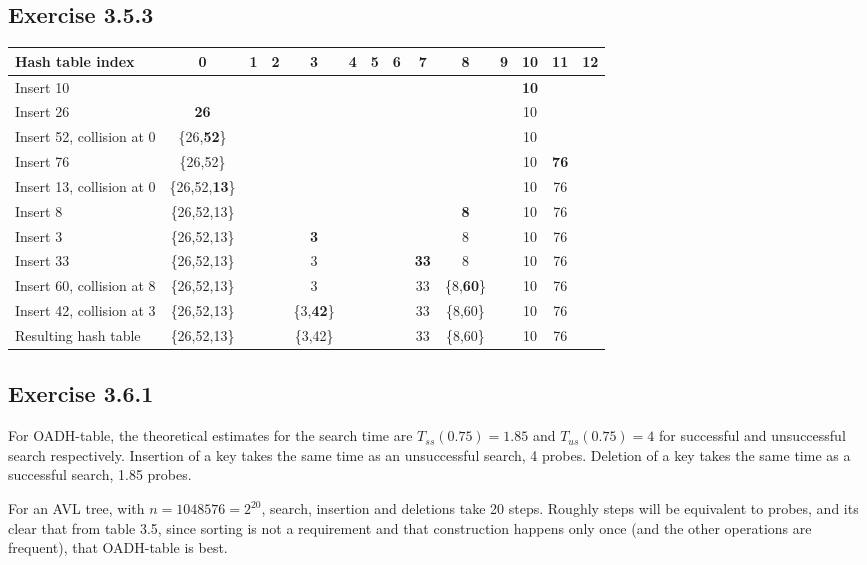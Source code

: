 \documentclass{article}
\begin{document}
\subsection*{Exercise 3.5.3}

\begin{tabular}{|l|c|c|c|c|c|c|c|c|c|c|c|c|c|}
\hline
Hash table index& 0& 1& 2& 3& 4& 5& 6& 7& 8& 9& 10& 11& 12 \\
\hline
Insert 10&&&&&&&&&&& \textbf{10}&& \\
\hline
Insert 26& \textbf{26}&&&&&&&&&& 10&& \\
\hline
Insert 52, collision at 0& \{26,\textbf{52}\}&&&&&&&&& & 10&& \\
\hline
Insert 76& \{26,52\}&&&&&&&&& & 10& \textbf{76}& \\
\hline
Insert 13, collision at 0& \{26,52,\textbf{13}\}&&&&&&&&& & 10& 76& \\
\hline
Insert 8& \{26,52,13\}&&&&&&&& \textbf{8}&& 10& 76& \\
\hline
Insert 3& \{26,52,13\}&&& \textbf{3}&&&&& 8&& 10& 76& \\
\hline
Insert 33& \{26,52,13\}&&& 3&&&& \textbf{33}& 8&& 10& 76& \\
\hline
Insert 60, collision at 8& \{26,52,13\}&&& 3&&&& 33& \{8,\textbf{60}\}&& 10& 76& \\
\hline
Insert 42, collision at 3& \{26,52,13\}&&& \{3,\textbf{42}\}&&&& 33& \{8,60\}&& 10& 76& \\
\hline
Resulting hash table& \{26,52,13\}&&& \{3,42\}&&&& 33& \{8,60\}&& 10& 76& \\
\hline
\end{tabular}


\subsection*{Exercise 3.6.1}

For OADH-table, the theoretical estimates for the search time are \(T_{ss}(0.75)=1.85\) and \(T_{us}(0.75)=4\) for successful and unsuccessful search respectively. Insertion of a key takes the same time as an unsuccessful search, 4 probes. Deletion of a key takes the same time as a successful search, 1.85 probes.

For an AVL tree, with \(n=1048576=2^{20}\), search, insertion and deletions take 20 steps. Roughly steps will be equivalent to probes, and its clear that from table 3.5, since sorting is not a requirement and that construction happens only once (and the other operations are frequent), that OADH-table is best.
\end{document}
